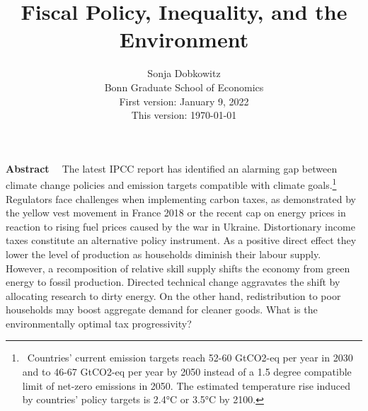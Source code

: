 \documentclass[12pt]{article}
\title{Fiscal Policy, Inequality, and the Environment}
\date{Sonja Dobkowitz\\ Bonn Graduate School of Economics\\ %
\vspace{1mm}
First version: January 9, 2022\\
This version: \today }
\renewenvironment{abstract}
{\small
	\list{}{
		\setlength{\leftmargin}{0.025\textwidth}%
		\setlength{\rightmargin}{\leftmargin}%
	}%
	\item\relax}
{\endlist}
\begin{document}
%	
	\maketitle
	\begin{comment}THIS ABSTRACT REFERS TO DEMAND REDUCTION POLICIES. whILE THE OTHER ONE BELOW ONLY MOTIVATES TO LOOK AT DISTORTIONARY INCOME TAXES AS AN ALTERNATIVE TO FOSSIL TAXES
	\begin{abstract}
		\begin{singlespacing}
			\textbf{Abstract \ }
			Natural scientists have identified a reduction of demand %
			as an important contributor to meeting global climate targets. However, a general equilibrium analysis of a demand reduction is missing.
			While as a direct effect environmental pollution declines through lowering production, it may have counteracting general equilibrium effects:
			A recomposition of relative skill supply shifts the economy away from green energy to fossil production. Directed technical change reacts by allocating research to dirty energy.
		\textbf{ I study the effect of a (voluntary) reduction in demand on the optimal environmental policy in a model accommodating directed technical change and skill heterogeneity.} When a voluntary reduction of demand is missing, the government can attain a reduction through distortionary income taxation. 

		\end{singlespacing}
		
		\end{abstract}
		\end{comment}
	\begin{abstract}
		\begin{comment}THIS ABSTRAC FOCUSES ON OPTIMAL INCOME TAXES BUT HAS A DIFFERENT TRADE OFF AND FOCUS: THE ENVIRONMENT´
		\end{comment}
		\begin{singlespacing}
			\textbf{Abstract \ }
			The latest IPCC report has identified an alarming gap between climate change policies and emission targets compatible with climate goals.\footnote{\ Countries' current emission targets reach 52-60 GtCO2-eq per year in 2030 and to 46-67 GtCO2-eq per year by 2050 instead of a 1.5 degree compatible limit of net-zero emissions in 2050. The estimated temperature rise induced by countries' policy targets is 2.4°C or 3.5°C by 2100. } Regulators face challenges when implementing carbon taxes, as demonstrated by the yellow vest movement in France 2018 or the recent cap on energy prices in reaction to rising fuel prices caused by the war in Ukraine.
			Distortionary income taxes constitute an alternative policy instrument. As a positive direct effect they lower the level of production as households diminish their labour supply. However, a recomposition of relative skill supply shifts the economy from green energy to fossil production. Directed technical change aggravates the shift by allocating research to dirty energy. 
			On the other hand, redistribution to poor households may boost aggregate demand for cleaner goods. 
			What is the environmentally optimal tax progressivity?
		\end{singlespacing}
	\end{abstract}
\end{document}
